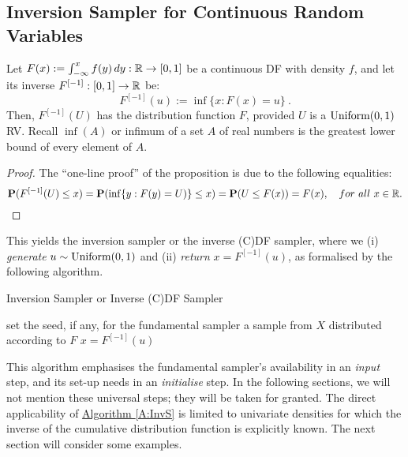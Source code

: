 \subsection{Inversion Sampler for Continuous Random Variables}\label{S:InvS}
\begin{prop}\label{P:InvS}
Let $F(x) := \int_{- \infty}^{x} f(y) \,d y : \mathbb{R} \rightarrow [0,1]$ be a continuous DF with density $f$, and let its inverse $F^{[-1]} : [0,1] \rightarrow \mathbb{R} $ be:
\[
F^{[-1]}(u) :=  \inf \{ x :  F(x) = u \} \ .
\]
Then, $F^{[-1]}(U)$ has the distribution function $F$, provided $U$ is a $\mbox{{\rm Uniform}}(0,1)$ RV.  Recall $\inf(A)$ or infimum of a set $A$ of real numbers is the greatest lower bound of every element of $A$.
\end{prop}
\begin{proof}
The ``one-line proof'' of the proposition is due to the following equalities:
\[
\mathbf{P}(F^{[-1]}(U) \leq x) = \mathbf{P}(\inf \{ y :  F(y) = U)\} \leq x ) = \mathbf{P}(U \leq F(x)) = F(x), \quad for~all~x \in \mathbb{R} .
\]
\end{proof}

This yields the inversion sampler or the inverse (C)DF sampler, where we (i) {\it generate} $u \sim \mbox{{\rm Uniform}}(0,1)$ and (ii) {\it return} $x = F^{[-1]}(u)$, as formalised by the following algorithm.

\begin{algorithm}
\caption{Inversion Sampler or Inverse (C)DF Sampler}
\label{A:InvS}
\begin{algorithmic}[1]
 set the seed, if any, for the fundamental sampler
 a sample from $X$ distributed according to $F$
 $x = F^{[-1]}(u)$
\end{algorithmic}
\end{algorithm}
This algorithm emphasises the fundamental sampler's availability in an {\it input} step, and its set-up needs in an {\it initialise} step.  In the following sections, we will not mention these universal steps; they will be taken for granted.  The direct applicability of \hyperref[A:InvS]{Algorithm \ref*{A:InvS}} is limited to univariate densities for which the inverse of the cumulative distribution function is explicitly known.  The next section will consider some examples.


